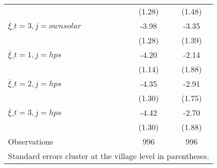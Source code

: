 \begin{table}[htbp]
{\begin{tabular}{l*{2}{c}}
                &   (1.28)         &   (1.48)         \\
$\overline{\xi}\_{t=3,j=own solar}$&    -3.98\sym{***}&    -3.35\sym{**} \\
                &   (1.28)         &   (1.39)         \\
$\overline{\xi}\_{t=1,j=hps}$&    -4.20\sym{***}&    -2.14         \\
                &   (1.14)         &   (1.88)         \\
$\overline{\xi}\_{t=2,j=hps}$&    -4.35\sym{***}&    -2.91\sym{*}  \\
                &   (1.30)         &   (1.75)         \\
$\overline{\xi}\_{t=3,j=hps}$&    -4.42\sym{***}&    -2.70         \\
                &   (1.30)         &   (1.88)         \\
\midrule
Observations    &      996         &      996         \\
\bottomrule
\multicolumn{3}{l}{\footnotesize Standard errors cluster at the village level in parentheses.}\\
\end{tabular}}
\end{table}
